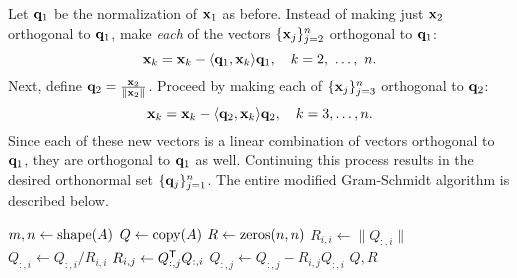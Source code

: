 Let $\mathbf{q}_1$ be the normalization of $\mathbf{x}_1$ as before.
Instead of making just $\mathbf{x}_2$ orthogonal to $\mathbf{q}_1$, make \emph{each} of the vectors $\{\mathbf{x}_j\}_{j=2}^n$ orthogonal to $\mathbf{q}_1$:
\[\mathbf{x}_k = \mathbf{x}_k - \langle \mathbf{q}_1,\mathbf{x}_{k} \rangle \mathbf{q}_1,\quad k=2,\ \ldots,\ n.\]
Next, define $\mathbf{q}_2 = \frac{\mathbf{x}_2}{\|\mathbf{x}_2\|}$.
Proceed by making each of $\{\mathbf{x}_j\}_{j=3}^n$ orthogonal to $\mathbf{q}_2$:
\[\mathbf{x}_k = \mathbf{x}_k - \langle \mathbf{q}_2,\mathbf{x}_{k} \rangle \mathbf{q}_2,\quad k=3,\ldots,n.\]
Since each of these new vectors is a linear combination of vectors orthogonal to $\mathbf{q}_1$, they are orthogonal to $\mathbf{q}_1$ as well.
Continuing this process results in the desired orthonormal set $\{\mathbf{q}_j\}_{j=1}^n$.
The entire modified Gram-Schmidt algorithm is described below. %

\begin{algorithm}[H]
\begin{algorithmic}[1]
    \State $m, n \gets \mathrm{shape}(A)$
    \State $Q \gets \mathrm{copy}(A)$
    \State $R \gets \zeros{n}{n}$
        \State $R_{i,i} \gets \|Q_{:,i}\|$\label{step:mgs-normalize}
        \State $Q_{:,i} \gets Q_{:,i}/R_{i,i}$\label{step:mgs-mult1}
            \State $R_{i,j} \gets Q_{:,j}^{\mathsf T}  Q_{:,i}$\label{step:mgs-mult2}
            \State $Q_{:,j} \gets Q_{:,j}-R_{i,j}Q_{:,i}$\label{step:mgs-mult3}
        \EndFor
    \EndFor
    \State {} $Q, R$
\EndProcedure
\end{algorithmic}
\caption{}
\label{Alg:modified-Gram-Schmidt}
\end{algorithm}

